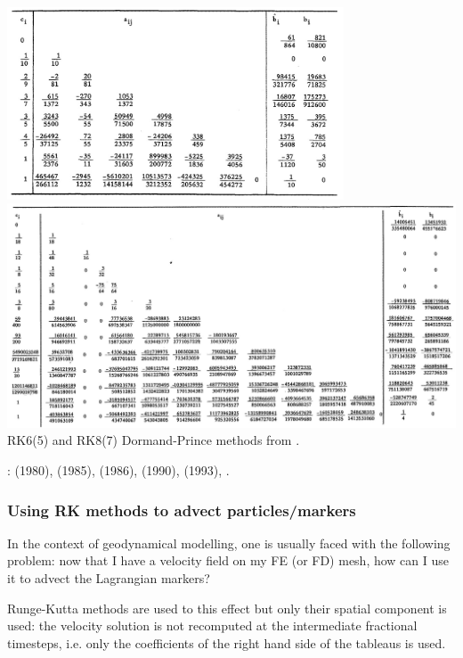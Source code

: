 \begin{center}
\includegraphics[width=10cm]{images/rungekutta/prdo81a}\\
\includegraphics[width=14cm]{images/rungekutta/prdo81b}\\
{\captionfont 
RK6(5) and RK8(7) Dormand-Prince methods from \cite{prdo81}.}
\end{center}

\Literature:
\textcite{dopr80} (1980),
\textcite{fehl85} (1985),
\textcite{dopr86} (1986),
\textcite{caka90} (1990),
\textcite{hanw93} (1993),
\textcite{butcher03}.


\subsubsection{Using RK methods to advect particles/markers \label{sec:rkparticles}}

In the context of geodynamical modelling, one is usually faced with the following problem:
now that I have a velocity field on my FE (or FD) mesh, how can I use it to advect the Lagrangian 
markers?

Runge-Kutta methods are used to this effect but only their spatial component is used:
the velocity solution is not recomputed at the intermediate fractional timesteps, i.e. 
only the coefficients of the right hand side of the tableaus is used.

